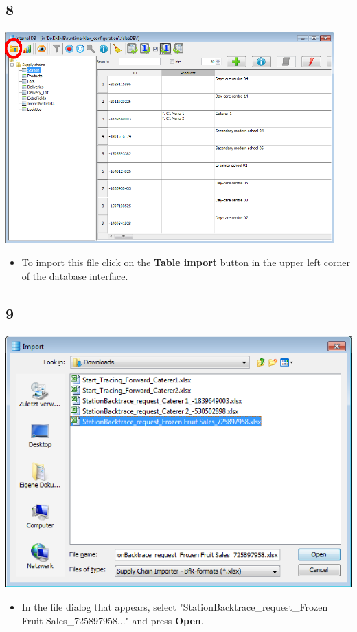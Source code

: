 \documentclass{beamer}
\begin{document}
\subsection{8}
\begin{frame}
	\begin{center}
  		\includegraphics[width=0.95\textwidth]{8.png}
	\end{center}
	\begin{itemize}
		\item To import this file click on the \textbf{Table import} button in the upper left corner of the database interface.
	\end{itemize}
\end{frame}

\subsection{9}
\begin{frame}
	\begin{center}
  		\includegraphics[height=0.6\textheight]{9.png}
	\end{center}
	\begin{itemize}
		\item In the file dialog that appears, select "StationBacktrace\_request\_Frozen Fruit Sales\_725897958..." and press \textbf{Open}.
	\end{itemize}
\end{frame}
\end{document}
